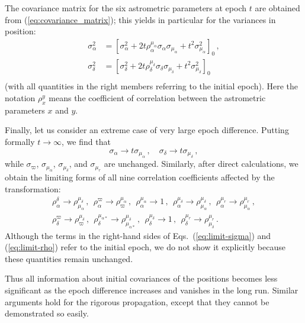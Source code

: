 \documentclass{aa}
\begin{document}
The covariance matrix for the six astrometric parameters at
epoch $t$ are obtained from (\ref{eq:covariance_matrix}); this
yields in particular for the variances in position:
\begin{equation}
 \begin{aligned}
  \sigma_{\alpha}^2 &=
   \left[
    \sigma_{\alpha}^2
   +2t\rho_{\alpha}^{\mu_{\alpha}}
    \sigma_{\alpha}\sigma_{\mu_{\alpha}}
   +t^2\sigma_{\mu_{\alpha}}^2
   \right]_0\,,\\
  \sigma_{\delta}^2 &=
   \left[
    \sigma_{\delta}^2
   +2t\rho_{\delta}^{\mu_{\delta}}
    \sigma_{\delta}\sigma_{\mu_{\delta}}
   +t^2\sigma_{\mu_{\delta}}^2
   \right]_0\\
 \end{aligned}
\end{equation}
(with all quantities in the right members referring to the initial epoch).
Here the notation $\rho_x^y$ means the coefficient of correlation between the
astrometric parameters $x$ and $y$.

Finally, let us consider an extreme case of very large epoch difference. Putting formally $t\to\infty$, we find that
\begin{equation}\label{eq:limit-sigma}
 \sigma_{\alpha}\to t\sigma_{\mu_{\alpha}}\,,\quad\sigma_{\delta}\to t\sigma_{\mu_{\delta}}\,,
\end{equation}
while $\sigma_\varpi$, $\sigma_{\mu_\alpha}$, $\sigma_{\mu_\delta}$, and $\sigma_{\mu_r}$
are unchanged.
Similarly, after direct calculations, we obtain the limiting forms of all nine correlation coefficients affected by the transformation:
\begin{multline}\label{eq:limit-rho}
  \rho_{\alpha}^\delta\to\rho_{\mu_{\alpha}}^{\mu_{\delta}}\,,~~
  \rho_{\alpha}^\varpi\to\rho_\varpi^{\mu_{\alpha}}\,,~~
  \rho_{\alpha}^{\mu_{\alpha}}\to1\,,~~
  \rho_{\alpha}^{\mu_{\delta}}\to\rho_{\mu_{\alpha}}^{\mu_{\delta}}\,,~~
  \rho_{\alpha}^{\mu_r}\to\rho_{\mu_{\alpha}}^{\mu_r}\,,\\
  \rho_\delta^\varpi\to\rho_\varpi^{\mu_{\delta}}\,,~~
  \rho_\delta^{\mu_{\alpha*}}\to\rho_{\mu_{\alpha*}}^{\mu_{\delta}}\,,~~
  \rho_\delta^{\mu_{\delta}}\to1\,,~~
  \rho_\delta^{\mu_r}\to\rho_{\mu_{\delta}}^{\mu_r}\,.
\end{multline}
Although the terms in the right-hand sides of Eqs.~(\ref{eq:limit-sigma}) and (\ref{eq:limit-rho}) refer to the initial epoch, we do not show it explicitly because these quantities remain unchanged.

Thus all information about initial covariances of the positions becomes less significant as the epoch difference increases and vanishes in the long run. Similar arguments hold for the rigorous propagation, except that they cannot be demonstrated so easily.
\end{document}
